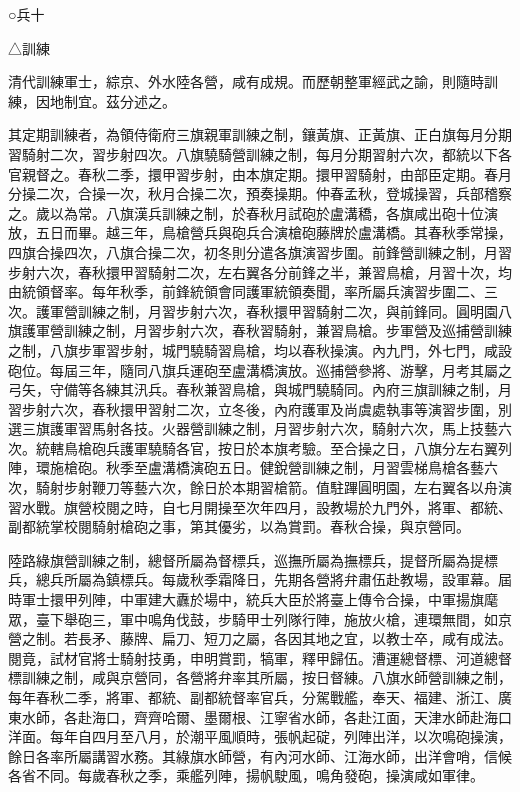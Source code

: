 
\begin{pinyinscope}
○兵十

△訓練

清代訓練軍士，綜京、外水陸各營，咸有成規。而歷朝整軍經武之諭，則隨時訓練，因地制宜。茲分述之。

其定期訓練者，為領侍衛府三旗親軍訓練之制，鑲黃旗、正黃旗、正白旗每月分期習騎射二次，習步射四次。八旗驍騎營訓練之制，每月分期習射六次，都統以下各官親督之。春秋二季，擐甲習步射，由本旗定期。擐甲習騎射，由部臣定期。春月分操二次，合操一次，秋月合操二次，預奏操期。仲春孟秋，登城操習，兵部稽察之。歲以為常。八旗漢兵訓練之制，於春秋月試砲於盧溝穚，各旗咸出砲十位演放，五日而畢。越三年，鳥槍營兵與砲兵合演槍砲藤牌於盧溝橋。其春秋季常操，四旗合操四次，八旗合操二次，初冬則分遣各旗演習步圍。前鋒營訓練之制，月習步射六次，春秋擐甲習騎射二次，左右翼各分前鋒之半，兼習鳥槍，月習十次，均由統領督率。每年秋季，前鋒統領會同護軍統領奏聞，率所屬兵演習步圍二、三次。護軍營訓練之制，月習步射六次，春秋擐甲習騎射二次，與前鋒同。圓明園八旗護軍營訓練之制，月習步射六次，春秋習騎射，兼習鳥槍。步軍營及巡捕營訓練之制，八旗步軍習步射，城門驍騎習鳥槍，均以春秋操演。內九門，外七門，咸設砲位。每屆三年，隨同八旗兵運砲至盧溝橋演放。巡捕營參將、游擊，月考其屬之弓矢，守備等各練其汛兵。春秋兼習鳥槍，與城門驍騎同。內府三旗訓練之制，月習步射六次，春秋擐甲習射二次，立冬後，內府護軍及尚虞處執事等演習步圍，別選三旗護軍習馬射各技。火器營訓練之制，月習步射六次，騎射六次，馬上技藝六次。統轄鳥槍砲兵護軍驍騎各官，按日於本旗考驗。至合操之日，八旗分左右翼列陣，環施槍砲。秋季至盧溝橋演砲五日。健銳營訓練之制，月習雲梯鳥槍各藝六次，騎射步射鞭刀等藝六次，餘日於本期習槍箭。值駐蹕圓明園，左右翼各以舟演習水戰。旗營校閱之時，自七月開操至次年四月，設教場於九門外，將軍、都統、副都統掌校閱騎射槍砲之事，第其優劣，以為賞罰。春秋合操，與京營同。

陸路綠旗營訓練之制，總督所屬為督標兵，巡撫所屬為撫標兵，提督所屬為提標兵，總兵所屬為鎮標兵。每歲秋季霜降日，先期各營將弁肅伍赴教場，設軍幕。屆時軍士擐甲列陣，中軍建大纛於場中，統兵大臣於將臺上傳令合操，中軍揚旗麾眾，臺下舉砲三，軍中鳴角伐鼓，步騎甲士列隊行陣，施放火槍，連環無間，如京營之制。若長矛、藤牌、扁刀、短刀之屬，各因其地之宜，以教士卒，咸有成法。閱竟，試材官將士騎射技勇，申明賞罰，犒軍，釋甲歸伍。漕運總督標、河道總督標訓練之制，咸與京營同，各營將弁率其所屬，按日督練。八旗水師營訓練之制，每年春秋二季，將軍、都統、副都統督率官兵，分駕戰艦，奉天、福建、浙江、廣東水師，各赴海口，齊齊哈爾、墨爾根、江寧省水師，各赴江面，天津水師赴海口洋面。每年自四月至八月，於潮平風順時，張帆起碇，列陣出洋，以次鳴砲操演，餘日各率所屬講習水務。其綠旗水師營，有內河水師、江海水師，出洋會哨，信候各省不同。每歲春秋之季，乘艦列陣，揚帆駛風，鳴角發砲，操演咸如軍律。


\end{pinyinscope}
